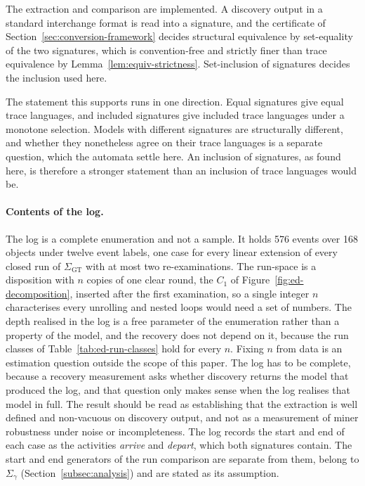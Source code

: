 The extraction and comparison are implemented. A discovery output in a standard
interchange format is read into a signature, and the certificate of
Section~\ref{sec:conversion-framework} decides structural equivalence by set-equality of the two
signatures, which is convention-free and strictly finer than trace equivalence by
Lemma~\ref{lem:equiv-strictness}. Set-inclusion of signatures decides the inclusion used here.

The statement this supports runs in one direction. Equal signatures give equal trace languages,
and included signatures give included trace languages under a monotone selection. Models with
different signatures are structurally different, and whether they nonetheless agree on their trace
languages is a separate question, which the automata settle here. An inclusion of signatures, as
found here, is therefore a stronger statement than an inclusion of trace languages would be.

\paragraph{Contents of the log.}
The log is a complete enumeration and not a sample. It holds 576 events over 168 objects under
twelve event labels, one case for every linear extension of every closed run of
$\Sigma_{\mathrm{GT}}$ with at most two re-examinations. The run-space is a disposition with
$n$ copies of one clear round, the $C_1$ of Figure~\ref{fig:ed-decomposition}, inserted after the
first examination, so a single
integer $n$ characterises every unrolling and nested loops would need a set of numbers. The depth realised in the log is a free parameter of the enumeration rather than a
property of the model, and the recovery does not depend on it, because the run classes of
Table~\ref{tab:ed-run-classes} hold for every $n$. Fixing $n$ from data is an
estimation question outside the scope of this paper. The log has to be complete, because a
recovery measurement asks whether discovery returns the model that produced the log, and that
question only makes sense when the log realises that model in full. The result should be read as
establishing that the extraction is well defined and non-vacuous on discovery output, and not as
a measurement of miner robustness under noise or incompleteness. The log records the start and
end of each case as the activities \emph{arrive} and \emph{depart}, which both signatures contain.
The start and end generators of the run comparison are separate from them, belong to
$\Sigma_\gamma$ (Section~\ref{subsec:analysis}) and are stated as its assumption.

